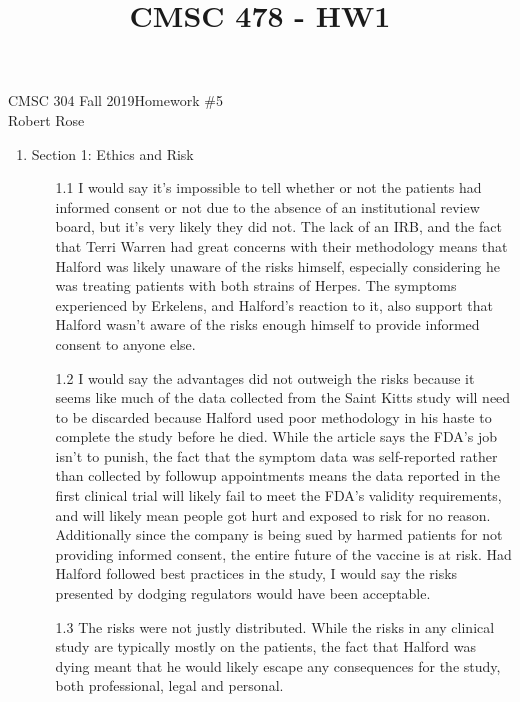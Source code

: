 \documentclass[12pt]{article}
\title{CMSC 478 - HW1}
\begin{document}
CMSC 304 Fall 2019\hfill Homework \#5\\
Robert Rose

\hrulefill

\begin{enumerate}
\item Section 1: Ethics and Risk

  \begin{enumerate}
  \item[1.1] I would say it's impossible to tell whether or not the patients had
        informed consent or not due to the absence of an institutional review
        board, but it's very likely they did not. The lack of an IRB, and the 
        fact that Terri Warren had great concerns with their methodology means
        that Halford was likely unaware of the risks himself, especially
        considering he was treating patients with both strains of Herpes. The
        symptoms experienced by Erkelens, and Halford's reaction to it, also 
        support that Halford wasn't aware of the risks enough himself to
        provide informed consent to anyone else.
        
  \item[1.2] I would say the advantages did not outweigh the risks because it seems
        like much of the data collected from the Saint Kitts study will need to
        be discarded because Halford used poor methodology in his haste to 
        complete the study before he died. While the article says the FDA's job
        isn't to punish, the fact that the symptom data was self-reported rather
        than collected by followup appointments means the data reported in the
        first clinical trial will likely fail to meet the FDA's validity 
        requirements, and will likely mean people got hurt and exposed to risk
        for no reason. Additionally since the company is being sued by harmed 
        patients for not providing informed consent, the entire future of the
        vaccine is at risk. Had Halford followed best practices in the study, 
        I would say the risks presented by dodging regulators would have been
        acceptable.
        
  \item[1.3] The risks were not justly distributed. While the risks in any clinical
        study are typically mostly on the patients, the fact that Halford was
        dying meant that he would likely escape any consequences for the study,
        both professional, legal and personal.
        

\end{enumerate}
\end{enumerate}
\end{document}
